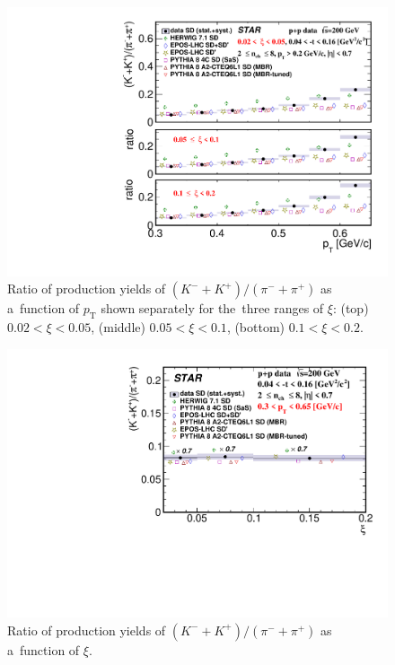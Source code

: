 \begin{figure}[b!]
	\centering
	\includegraphics[width=.99\textwidth,page=1]{chapters/chrgSTAR/img/results/particleRatio_Kpi_.pdf}
	\caption{Ratio of production yields of  $\left(K^-+K^+\right)/\left(\pi^-+\pi^+\right)$ as a~function of $p_\textrm{T}$ shown separately for the~three ranges of $\xi$: (top) $0.02<\xi<0.05$, (middle) $0.05<\xi<0.1$, (bottom) $0.1<\xi<0.2$. }
	\label{fig:results_Kpi_ratio}
	
\end{figure}

\begin{figure}[b!]
	\centering
	\includegraphics[width=.99\textwidth,page=1]{chapters/chrgSTAR/img/results/outPID_Kpi_ratio_xi.pdf}
	\caption{Ratio of production yields of $\left(K^-+K^+\right)/\left(\pi^-+\pi^+\right)$ as a~function of $\xi$. }
	\label{fig:results_Kpi_xi}
	
\end{figure}

\FloatBarrier